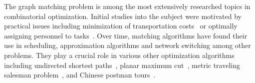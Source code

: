 The graph matching problem is among the most extensively researched topics in combinatorial optimization. Initial studies into the subject were motivated by practical issues including minimization of transportation costs~\cite{hitchcock1941distribution} or optimally assigning personnel to tasks~\cite{thorndike1950problem}. Over time, matching algorithms have found their use in scheduling, approximation algorithms and network switching among other problems. They play a crucial role in various other optimization algorithms including undirected shortest paths~\cite{lawler2001combinatorial}, planar maximum cut~\cite{hadlock1975finding}, metric traveling salesman problem~\cite{christofides2022worst}, and Chinese postman tours~\cite{edmonds1973matching}.
